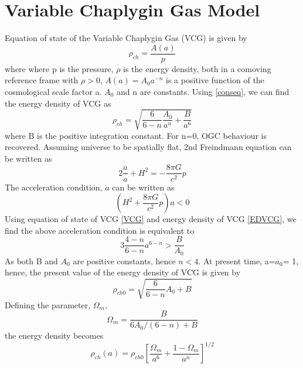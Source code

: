 \section{Variable Chaplygin Gas Model}
Equation of state of the Variable Chaplygin Gas (VCG) is given by
\begin{equation}\label{VCG}
    \rho_{ch}=\frac{A(a)}{p}
\end{equation}
where where p is the pressure, $\rho$ is the energy density, both in a comoving reference frame with $\rho>0$, $A(a) = A_0 a^{-n}$ is a positive function of the cosmological scale factor a. $A_0$ and n are constants. Using \ref{conseq}, we can find the energy density of VCG as
\begin{equation}\label{EDVCG}
    \rho_{c h}=\sqrt{\frac{6}{6-n} \frac{A_{0}}{a^{n}}+\frac{B}{a^{6}}}
\end{equation}
where B is the positive integration constant. For n=0, OGC behaviour is recovered. Assuming universe to be spatially flat, 2nd Freindmann equation can be written as 
\begin{equation}
    2\frac{\ddot a}{a} + H^2=-\frac{8 \pi G}{c^2} p
\end{equation}
The acceleration condition, $\ddot a$ can be written as
\begin{equation}
    (H^2 +\frac{8\pi G}{c^2}p)a<0
\end{equation} 
Using equation of state of VCG \ref{VCG} and energy density of VCG \ref{EDVCG}, we find the above acceleration condition is equivalent to 
\begin{equation}
    3 \frac{4-n}{6-n} a^{6-n} >\frac{B}{A_0}
\end{equation}
As both B and $A_0 $ are positive constants, hence $n<4$. At present time, a=$a_0 $= 1, hence, the present value of the energy density of VCG is given by
\begin{equation}
    \rho_{ch0}=\sqrt{\frac{6}{6-n} A_{0}+B}
\end{equation}
Defining the parameter, $\Omega_m$,
\begin{equation}
    \Omega_{m}=\frac{B}{6 A_{0} /(6-n)+B}
\end{equation}
the energy density becomes
\begin{equation}\label{VCGdensity}
    \rho_{ch}(a)=\rho_{c h 0}\left[\frac{\Omega_{m}}{a^{6}}+\frac{1-\Omega_{m}}{a^{n}}\right]^{1 / 2}
\end{equation}

